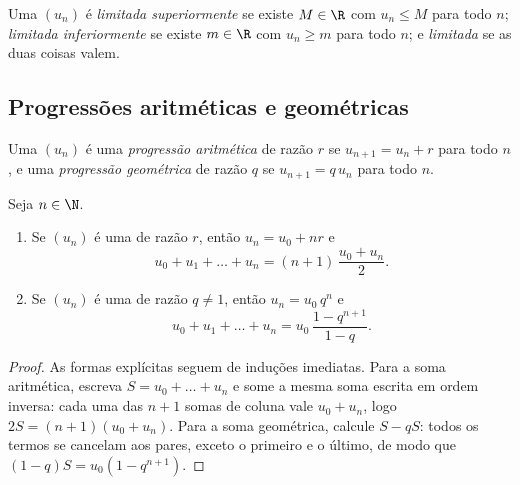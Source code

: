 \begin{definition}\label{def:g12:seq:bounded}
Uma  $(u_n)$ é \emph{limitada
superiormente} se existe $M \in \R$ com
$u_n \leq M$ para todo $n$; \emph{limitada inferiormente} se existe
$m \in \R$ com $u_n \geq m$ para todo $n$; e \emph{limitada} se as duas
coisas valem.
\end{definition}

\subsection{Progressões aritméticas e geométricas}

\begin{definition}\label{def:g12:seq:arith-geom}
Uma  $(u_n)$ é uma \emph{progressão
aritmética} de razão $r$ se
$u_{n+1} = u_n + r$ para todo $n$, e uma \emph{progressão
geométrica} de razão $q$ se $u_{n+1} = q\,u_n$
para todo $n$.
\end{definition}

\begin{proposition}\label{prop:g12:seq:arith-geom}
Seja $n \in \N$.
\begin{enumerate}
  \item Se $(u_n)$ é uma  de razão $r$, então
        $u_n = u_0 + nr$ e
        \[
        u_0 + u_1 + \dots + u_n = (n+1)\,\frac{u_0 + u_n}{2}.
        \]
  \item Se $(u_n)$ é uma  de razão $q \neq 1$, então
        $u_n = u_0\, q^n$ e
        \[
        u_0 + u_1 + \dots + u_n = u_0\,\frac{1 - q^{n+1}}{1 - q}.
        \]
\end{enumerate}
\end{proposition}

\begin{proof}
As formas explícitas seguem de induções imediatas. Para a soma
aritmética, escreva $S = u_0 + \dots + u_n$ e some a mesma soma escrita em
ordem inversa: cada uma das $n+1$ somas de coluna vale $u_0 + u_n$, logo
$2S = (n+1)(u_0+u_n)$. Para a soma geométrica, calcule $S - qS$: todos os
termos se cancelam aos pares, exceto o primeiro e o último, de modo que
$(1-q)S = u_0(1 - q^{n+1})$.
\end{proof}

